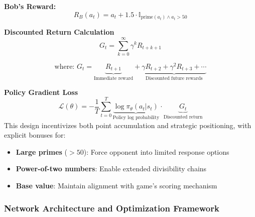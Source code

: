 \documentclass[twocolumn, a4paper]{article}
\begin{document}
\textbf{Bob's Reward:}
\begin{equation}
R_B(a_t) = a_t + 1.5 \cdot \mathbb{I}_{\text{prime}(a_t) \land a_t > 50}
\end{equation}

\textbf{Discounted Return Calculation}
\begin{equation}
G_t = \sum_{k=0}^{\infty} \gamma^k R_{t+k+1}
\end{equation}

\begin{equation}
\text{where: } G_t = \underbrace{R_{t+1}}_{\text{Immediate reward}} + \underbrace{\gamma R_{t+2} + \gamma^2 R_{t+3} + \cdots}_{\text{Discounted future rewards}}
\end{equation}

\textbf{Policy Gradient Loss}
\begin{equation}
\mathcal{L}(\theta) = -\frac{1}{T} \sum_{t=0}^{T} \underbrace{\log \pi_\theta(a_t | s_t)}_{\text{Policy log probability}} \cdot \underbrace{G_t}_{\text{Discounted return}}
\end{equation}
 This design incentivizes both point accumulation and strategic positioning, with explicit bonuses for:
\begin{itemize}
\item \textbf{Large primes} ($>50$): Force opponent into limited response options
\item \textbf{Power-of-two numbers}: Enable extended divisibility chains
\item \textbf{Base value}: Maintain alignment with game's scoring mechanism
\end{itemize}



\subsubsection{Network Architecture and Optimization Framework}
\end{document}
